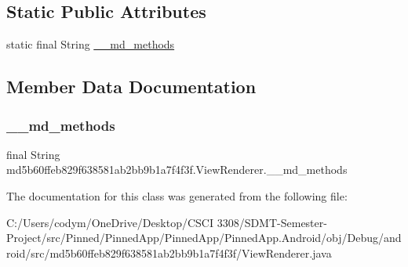 \subsection*{Static Public Attributes}
\begin{DoxyCompactItemize}
\item 
static final String \hyperlink{classmd5b60ffeb829f638581ab2bb9b1a7f4f3f_1_1_view_renderer_a9d61e0ff54f2c1a789912ef2d2e97d9d}{\+\_\+\+\_\+md\+\_\+methods}
\end{DoxyCompactItemize}


\subsection{Member Data Documentation}
\mbox{\label{classmd5b60ffeb829f638581ab2bb9b1a7f4f3f_1_1_view_renderer_a9d61e0ff54f2c1a789912ef2d2e97d9d}} 
\subsubsection{\texorpdfstring{\+\_\+\+\_\+md\+\_\+methods}{\_\_md\_methods}}
{\footnotesize\ttfamily final String md5b60ffeb829f638581ab2bb9b1a7f4f3f.\+View\+Renderer.\+\_\+\+\_\+md\+\_\+methods\hspace{0.3cm}{\ttfamily [static]}}



The documentation for this class was generated from the following file\+:\begin{DoxyCompactItemize}
\item 
C\+:/\+Users/codym/\+One\+Drive/\+Desktop/\+C\+S\+C\+I 3308/\+S\+D\+M\+T-\/\+Semester-\/\+Project/src/\+Pinned/\+Pinned\+App/\+Pinned\+App/\+Pinned\+App.\+Android/obj/\+Debug/android/src/md5b60ffeb829f638581ab2bb9b1a7f4f3f/View\+Renderer.\+java\end{DoxyCompactItemize}
